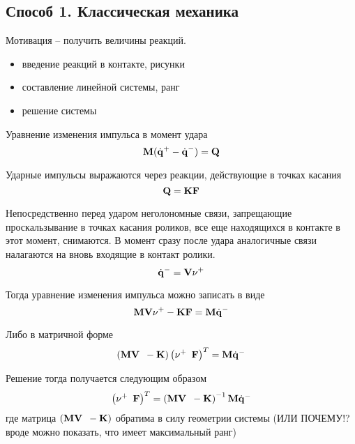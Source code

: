 \subsection{Способ 1. Классическая механика}

Мотивация -- получить величины реакций.

\begin{itemize}
    \item введение реакций в контакте, рисунки
    \item составление линейной системы, ранг
    \item решение системы
\end{itemize}

Уравнение изменения импульса в момент удара
\begin{equation*}
\mathbf{M} (\dot{\mathbf{q}}^+ - \dot{\mathbf{q}}^-) = \mathbf{Q}
\end{equation*}

Ударные импульсы выражаются через реакции, действующие в точках касания
\begin{equation*}
\mathbf{Q} = \mathbf{K}\mathbf{F}
\end{equation*}

Непосредственно перед ударом неголономные связи, запрещающие проскальзывание в точках касания роликов, все еще находящихся в контакте в этот момент, снимаются.
В момент сразу после удара аналогичные связи налагаются на вновь входящие в контакт ролики.
\begin{equation*}
\dot{\mathbf{q}}^- = \mathbf{V}\mathbf{\nu}^+
\end{equation*}

Тогда уравнение изменения импульса можно записать в виде
\begin{equation*}
\mathbf{M}\mathbf{V}\mathbf{\nu}^+ - \mathbf{K}\mathbf{F} = \mathbf{M}\dot{\mathbf{q}}^-
\end{equation*}

Либо в матричной форме
\begin{equation*}
\left(\mathbf{M}\mathbf{V} \enspace -\mathbf{K}\right) \left(\mathbf{\nu}^+ \enspace \mathbf{F}\right)^T = \mathbf{M}\dot{\mathbf{q}}^-
\end{equation*}

Решение тогда получается следующим образом
\begin{equation*}
\left(\mathbf{\nu}^+ \enspace \mathbf{F}\right)^T = \left(\mathbf{M}\mathbf{V} \enspace -\mathbf{K}\right)^{-1} \mathbf{M}\dot{\mathbf{q}}^-
\end{equation*}
где матрица $\left(\mathbf{M}\mathbf{V} \enspace -\mathbf{K}\right)$ обратима в силу геометрии системы (ИЛИ ПОЧЕМУ!? вроде можно показать, что имеет максимальный ранг)


